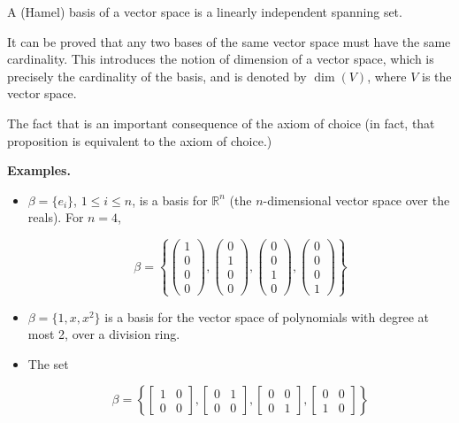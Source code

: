 \documentclass[12pt]{article}
\begin{document}

A (Hamel) basis of a vector space is a linearly independent spanning set.

It can be proved that any two bases of the same vector space must have the same cardinality. This introduces the notion of dimension of a vector space, which is precisely the cardinality of the basis, and is denoted by $\operatorname{dim}(V)$, where $V$ is the vector space.

The fact that  is an important consequence of the axiom of choice (in fact, that proposition is equivalent to the axiom of choice.)

{\bf Examples.}

\begin{itemize}

\item $\beta = \{e_i\}$, $1\le i \le n$, is a basis for $\mathbb{R}^n$ (the $n$-dimensional vector space over the reals).  For $n=4$, 

$$ \beta = \left\{ \begin{pmatrix} 1 \\ 0 \\ 0 \\ 0 \end{pmatrix} ,
\begin{pmatrix} 0 \\ 1 \\ 0 \\ 0 \end{pmatrix} ,
\begin{pmatrix} 0 \\ 0 \\ 1 \\ 0 \end{pmatrix} ,
\begin{pmatrix} 0 \\ 0 \\ 0 \\ 1 \end{pmatrix} \right\}   $$

\item $ \beta = \{ 1, x , x^2 \} $ is a basis for the vector space of polynomials with degree at most 2, over a division ring.

\item The set

$$ \beta =   
\left\{ \begin{bmatrix}1 & 0 \\ 0 & 0 \end{bmatrix} ,
\begin{bmatrix}0 & 1 \\ 0 & 0 \end{bmatrix} ,
\begin{bmatrix}0 & 0 \\ 0 & 1 \end{bmatrix} ,
\begin{bmatrix}0 & 0 \\ 1 & 0 \end{bmatrix} \right\} $$ 


\end{itemize}
\end{document}
